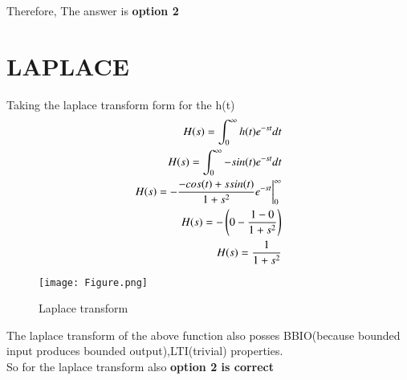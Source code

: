\documentclass[journal,12pt,twocolumn]{IEEEtran}
\begin{document}
 Therefore, The answer is \textbf{option 2}
 \section*{LAPLACE}
Taking the laplace transform form for the h(t)
\begin{align}
    H(s)= \int_{0}^{\infty} h(t) e^{-st} dt\\
    H(s)= \int_{0}^{\infty} -sin(t) e^{-st} dt \\
    H(s)= -\frac{-cos(t)+ssin(t)}{1+s^2} e^{-st} \bigg\rvert^{\infty}_{0}\\
    H(s) = -\left(0 - \frac{1-0}{1+s^2}\right)\\
    H(s) = \frac{1}{1+s^2}
\end{align}
\begin{figure}
    \centering
    \texttt{[image: Figure.png]}
    \caption{Laplace transform}
    \label{fig:my_label}
\end{figure}
The laplace transform of the above function also posses BBIO(because bounded input produces bounded output),LTI(trivial) properties.\\
So for the laplace transform also \textbf{option 2 is correct}
\end{document}
